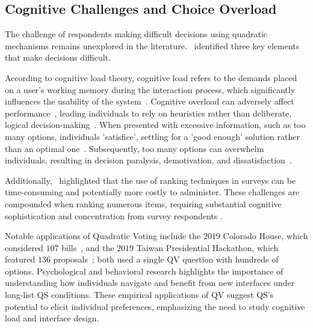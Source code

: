 \subsection{Cognitive Challenges and Choice Overload}
The challenge of respondents making difficult decisions using quadratic mechanisms remains unexplored in the literature.~\textcite{lichtensteinConstructionPreference2006} identified three key elements that make decisions difficult. 

According to cognitive load theory, cognitive load refers to the demands placed on a user's working memory during the interaction process, which significantly influences the usability of the system~\cite{cooper1998research, seppCognitiveLoadTheory2019}. Cognitive overload can adversely affect performance~\cite{drommi2001interface}, leading individuals to rely on heuristics rather than deliberate, logical decision-making~\cite{daniel2017thinking}. When presented with excessive information, such as too many options, individuals 'satisfice', settling for a 'good enough' solution rather than an optimal one~\cite{simonBehavioralModelRational1955, payneAdaptiveStrategySelection1988, tverskyJudgmentsRepresentativeness}. Subsequently, too many options can overwhelm individuals, resulting in decision paralysis, demotivation, and dissatisfaction~\cite{iyengarWhenChoiceDemotivating2000}.

Additionally,~\textcite{alwinMeasurementValuesSurveys1985} highlighted that the use of ranking techniques in surveys can be time-consuming and potentially more costly to administer. These challenges are compounded when ranking numerous items, requiring substantial cognitive sophistication and concentration from survey respondents \cite{featherMeasurementValuesEffects1973}.

Notable applications of Quadratic Voting include the $2019$ Colorado House, which considered $107$ bills~\cite{coyNewWayVoting2019}, and the $2019$ Taiwan Presidential Hackathon, which featured $136$ proposals~\cite{QuadraticVotingFrontend2022}; both used a single QV question with hundreds of options. Psychological and behavioral research highlights the importance of understanding how individuals navigate and benefit from new interfaces under long-list QS conditions. These empirical applications of QV suggest QS's potential to elicit individual preferences, emphasizing the need to study cognitive load and interface design.

